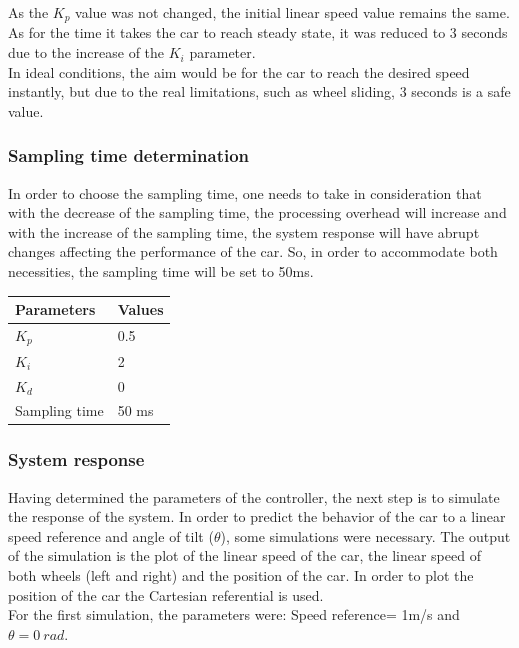 As the $K_p$ value was not changed, the initial linear speed value remains the same. As for the time it takes the car to reach steady state, it was reduced to 3 seconds due to the increase of the $K_i$ parameter.\\
In ideal conditions, the aim would be for the car to reach the desired speed
instantly, but due to the real limitations, such as wheel sliding, 3 seconds is
a safe value.
%
\subsubsection{Sampling time determination}
In order to choose the sampling time, one needs to take in consideration that with the decrease of the sampling time, the processing overhead will increase and with the increase of the sampling time, the system response will have abrupt changes affecting the performance of the car. So, in order to accommodate both necessities, the sampling time will be set to 50ms.
\begin{table}[]
\begin{tabular}{|l|l|}
\hline
\rowcolor[HTML]{FFFFFF} 
Parameters    & Values \\ \hline
$K_p$         & 0.5    \\ \hline
\rowcolor[HTML]{FFFFFF} 
$K_i$         & 2      \\ \hline
\rowcolor[HTML]{FFFFFF} 
$K_d$         & 0      \\ \hline
\rowcolor[HTML]{FFFFFF} 
Sampling time & 50 ms  \\ \hline
\end{tabular}
\end{table}
\subsubsection{System response}
\label{sec:des-sim-res}
Having determined the parameters of the controller, the next step is to simulate the response of the system.
In order to predict the behavior of the car to a linear speed reference and angle of tilt ($\theta$), some simulations were necessary. The output of the simulation is the plot of the linear speed of the car, the linear speed of both wheels (left and right) and the position of the car.
In order to plot the position of the car the Cartesian referential is used.\\
For the first simulation, the parameters were: Speed reference= 1m/s and $\theta = 0~\si{rad}$.\\


